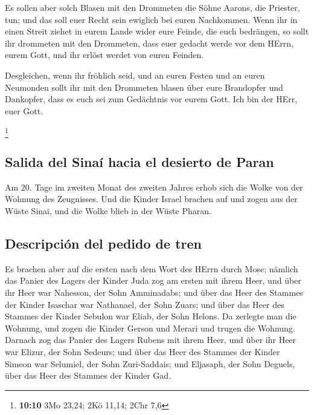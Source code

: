  Es sollen aber solch Blasen mit den Drommeten die Söhne
Aarons, die Priester, tun; und das soll euer Recht sein ewiglich bei
euren Nachkommen.  Wenn ihr in einen Streit ziehet in
eurem Lande wider eure Feinde, die euch bedrängen, so sollt ihr
drommeten mit den Drommeten, dass euer gedacht werde vor dem HErrn,
eurem Gott, und ihr erlöst werdet von euren Feinden.

 Desgleichen, wenn ihr fröhlich seid, und an euren Festen
und an euren Neumonden sollt ihr mit den Drommeten blasen über eure
Brandopfer und Dankopfer, dass es euch sei zum Gedächtnis vor eurem
Gott. Ich bin der HErr, euer Gott.

\footnote{\textbf{10:10} 3Mo 23,24; 2Kö 11,14; 2Chr 7,6}

\hypertarget{salida-del-sinauxed-hacia-el-desierto-de-paran}{%
\subsection{Salida del Sinaí hacia el desierto de
Paran}\label{salida-del-sinauxed-hacia-el-desierto-de-paran}}

 Am 20. Tage im zweiten Monat des zweiten Jahres erhob
sich die Wolke von der Wohnung des Zeugnisses.  Und die
Kinder Israel brachen auf und zogen aus der Wüste Sinai, und die Wolke
blieb in der Wüste Pharan.

\hypertarget{descripciuxf3n-del-pedido-de-tren}{%
\subsection{Descripción del pedido de
tren}\label{descripciuxf3n-del-pedido-de-tren}}

 Es brachen aber auf die ersten nach dem Wort des HErrn
durch Mose;  nämlich das Panier des Lagers der Kinder
Juda zog am ersten mit ihrem Heer, und über ihr Heer war Nahesson, der
Sohn Amminadabs;  und über das Heer des Stammes der
Kinder Isaschar war Nathanael, der Sohn Zuars;  und über
das Heer des Stammes der Kinder Sebulon war Eliab, der Sohn Helons.
 Da zerlegte man die Wohnung, und zogen die Kinder Gerson
und Merari und trugen die Wohnung.  Darnach zog das
Panier des Lagers Rubens mit ihrem Heer, und über ihr Heer war Elizur,
der Sohn Sedeurs;  und über das Heer des Stammes der
Kinder Simeon war Selumiel, der Sohn Zuri-Saddais;  und
Eljasaph, der Sohn Deguels, über das Heer des Stammes der Kinder Gad.

